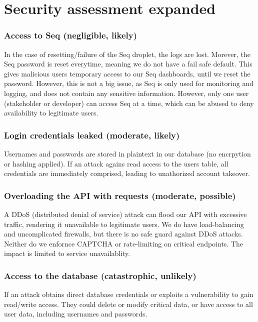 \section{Security assessment expanded}
\label{appn:B}

\subsubsection{Access to Seq (negligible, likely)}

In the case of resetting/failure of the Seq droplet, the logs 
are lost. Morever, the Seq password is reset everytime, meaning we 
do not have a fail safe default. This gives malicious users temporary 
access to our Seq dashboards, until we reset the password. However, 
this is not a big issue, as Seq is only used for monitoring and logging, 
and does not contain any sensitive information. However, only one user 
(stakeholder or developer) can access Seq at a time, 
which can be abused to deny availability to legitimate users.

\subsubsection{Login credentials leaked (moderate, likely)}

Usernames and passwords are stored in plaintext in our 
database (no encrpytion or hashing applied). If an attack 
agains read access to the users table, all credentials are 
immediately comprised, leading to unathorized account takeover. 

\subsubsection{Overloading the API with requests (moderate, possible)}

A DDoS (distributed denial of service) attack can flood our API with 
excessive traffic, rendering it unavailable to legitimate users. 
We do have load-balancing and uncomplicated firewalls, but there is no 
safe guard against DDoS attacks. Neither do we enfornce CAPTCHA or 
rate-limiting on critical endpoints. 
The impact is limited to service unavailablity. 

\subsubsection{Access to the database (catastrophic, unlikely)}

If an attack obtains direct database credentials or exploits a 
vulnerability to gain read/write access. They could delete or modify 
critical data, or have access to all user data, including usernames 
and passwords.

